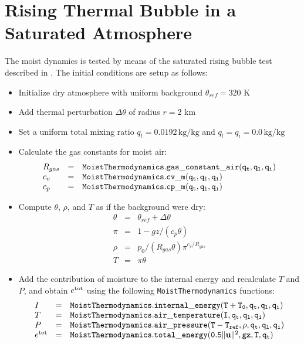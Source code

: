 \documentclass{report}
\begin{document}
\section{Rising Thermal Bubble in a Saturated Atmosphere}
\label{s:rtb_moist}
The moist dynamics is tested by means of the saturated rising bubble test described in \cite{Pressel15a}. The initial conditions are setup as follows:

\begin{itemize}
\item Initialize dry atmosphere with uniform background $\theta_{ref} = 320$ K
\item Add thermal perturbation $\Delta \theta$ of radius $r=2$ km
\item Set a uniform total mixing ratio $q_t = 0.0192 \,\mathrm{kg/kg}$ and $q_l = q_i = 0.0\,\mathrm{kg/kg}$
\item Calculate the gas constants for moist air: 
\[\begin{array}{lcl}
R_{gas} &=& {\tt MoistThermodynamics.gas\_constant\_air(q_t, q_l, q_i)}\\
c_v     &=& {\tt MoistThermodynamics.cv\_m(q_t, q_l, q_i)}\\
c_p     &=& {\tt MoistThermodynamics.cp\_m(q_t, q_l, q_i)}\\
\end{array}
\]
\item  Compute $\theta$, $\rho$, and $T$ as if the background were dry:\\
    \[ \begin{array}{lcl}
  \theta &=& \theta_{ref} + \Delta\theta\\
 \pi & =& 1 - gz/(c_p\theta)\\
 \rho & = & p_0/(R_{gas}\theta)\pi^{c_v/R_{gas}}\\
 T   & = &\pi \theta
\end{array}\]

\item Add the contribution of moisture to the internal energy and recalculate $T$ and $P$, and obtain $e^{\rm tot}$ using the following {\tt MoistThermodynamics} functions:
\[\begin{array}{lcl}
I &=& {\tt MoistThermodynamics.internal\_energy(T + T_0, q_t, q_l, q_i)}\\
T &=& {\tt MoistThermodynamics.air\_temperature(I, q_t, q_l, q_i)}\\
P &=& {\tt MoistThermodynamics.air\_pressure(T - T_{ref} , \rho, q_t, q_l, q_i)}\\
e^{\rm tot} &=& {\tt MoistThermodynamics.total\_energy(0.5\|{\bf u} \|^2, gz, T, q_t)}
\end{array}\]
\end{itemize}
\end{document}
